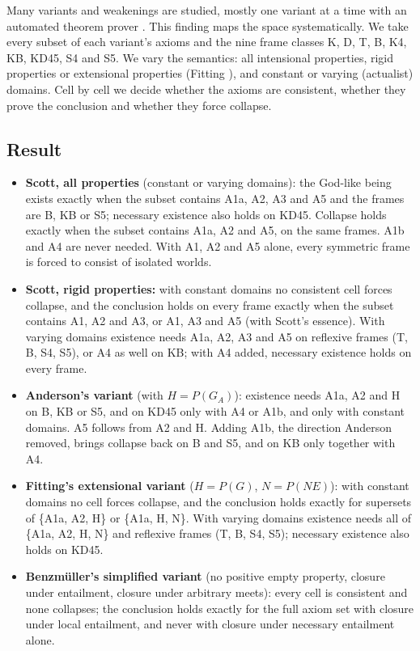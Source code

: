 \documentclass{article}
\begin{document}
Many variants and weakenings are studied, mostly one variant at a time with an automated
theorem prover \cite{benzmueller2025notes,benzmueller2026lean,benzmueller2020simplified,benzmueller2019ultrafilters}. This finding maps the space systematically. We take every subset
of each variant's axioms and the nine frame classes K, D, T, B, K4, KB, KD45, S4 and S5. We
vary the semantics: all intensional properties, rigid properties or extensional properties
(Fitting \cite{fitting2002types}), and constant or varying (actualist) domains. Cell by cell we
decide whether the axioms are consistent, whether they prove the conclusion and whether they
force collapse.

\subsection*{Result}

\begin{itemize}
\item \textbf{Scott, all properties} (constant or varying domains): the God-like being exists exactly when the subset contains A1a, A2, A3 and A5 and the frames are B, KB or S5; necessary existence also holds on KD45. Collapse holds exactly when the subset contains A1a, A2 and A5, on the same frames. A1b and A4 are never needed. With A1, A2 and A5 alone, every symmetric frame is forced to consist of isolated worlds.
\item \textbf{Scott, rigid properties:} with constant domains no consistent cell forces collapse, and the conclusion holds on every frame exactly when the subset contains A1, A2 and A3, or A1, A3 and A5 (with Scott's essence). With varying domains existence needs A1a, A2, A3 and A5 on reflexive frames (T, B, S4, S5), or A4 as well on KB; with A4 added, necessary existence holds on every frame.
\item \textbf{Anderson's variant} (with $H = P(G_A)$): existence needs A1a, A2 and H on B, KB or S5, and on KD45 only with A4 or A1b, and only with constant domains. A5 follows from A2 and H. Adding A1b, the direction Anderson removed, brings collapse back on B and S5, and on KB only together with A4.
\item \textbf{Fitting's extensional variant} ($H = P(G)$, $N = P(NE)$): with constant domains no cell forces collapse, and the conclusion holds exactly for supersets of \{A1a, A2, H\} or \{A1a, H, N\}. With varying domains existence needs all of \{A1a, A2, H, N\} and reflexive frames (T, B, S4, S5); necessary existence also holds on KD45.
\item \textbf{Benzmüller's simplified variant} (no positive empty property, closure under entailment, closure under arbitrary meets): every cell is consistent and none collapses; the conclusion holds exactly for the full axiom set with closure under local entailment, and never with closure under necessary entailment alone.
\end{itemize}
\end{document}
